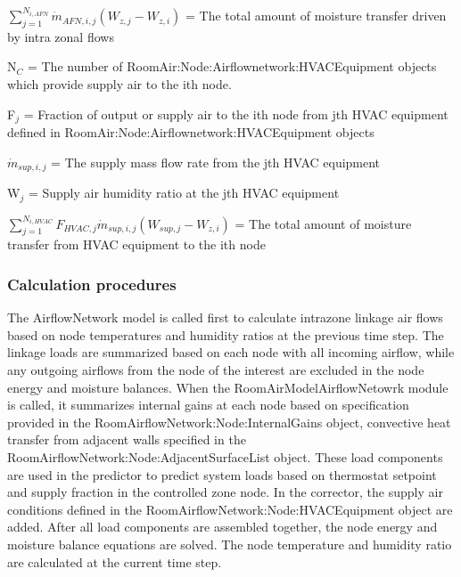 \({\sum\limits_{j = 1}^{N_{i,AFN}} \dot m_{AFN,i,j} \left( W_{z,j} - W_{z,i}\right)}\) = The total amount of moisture transfer driven by intra zonal flows

N\(_{C}\) = The number of RoomAir:Node:Airflownetwork:HVACEquipment objects which provide supply air to the ith node.

F\(_{j}\) = Fraction of output or supply air to the ith node from jth HVAC equipment defined in RoomAir:Node:Airflownetwork:HVACEquipment objects

\({\dot m}_{sup,i,j}\) = The supply mass flow rate from the jth HVAC equipment

W\(_{j}\) = Supply air humidity ratio at the jth HVAC equipment

\({\sum\limits_{j = 1}^{N_{i,HVAC}} F_{HVAC,j} \dot m_{sup,i,j} \left( W_{sup,j} - W_{z,i}\right)}\) = The total amount of moisture transfer from HVAC equipment to the ith node

\subsubsection{Calculation procedures}\label{calculation-procedures}

The AirflowNetwork model is called first to calculate intrazone linkage air flows based on node temperatures and humidity ratios at the previous time step. The linkage loads are summarized based on each node with all incoming airflow, while any outgoing airflows from the node of the interest are excluded in the node energy and moisture balances. When the RoomAirModelAirflowNetowrk module is called, it summarizes internal gains at each node based on specification provided in the RoomAirflowNetwork:Node:InternalGains object, convective heat transfer from adjacent walls specified in the RoomAirflowNetwork:Node:AdjacentSurfaceList object. These load components are used in the predictor to predict system loads based on thermostat setpoint and supply fraction in the controlled zone node. In the corrector, the supply air conditions defined in the RoomAirflowNetwork:Node:HVACEquipment object are added. After all load components are assembled together, the node energy and moisture balance equations are solved. The node temperature and humidity ratio are calculated at the current time step.  

